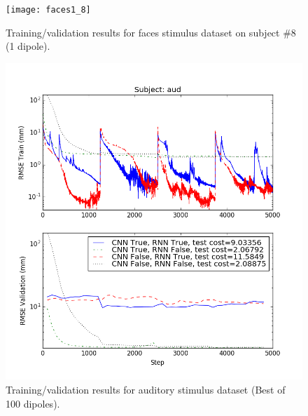\documentclass[journal]{IEEEtran}
\begin{document}
\begin{figure}[!h]
\centering
\texttt{[image: faces1\_8]}
\caption{Training/validation results for faces stimulus dataset on subject \#8 (1 dipole).}
\label{fig:faces_8}
\end{figure}

\begin{figure}[!h]
\centering
\includegraphics[width=6.75in]{aud100}
\caption{Training/validation results for auditory stimulus dataset (Best of 100 dipoles).}
\label{fig:aud100}
\end{figure}
\end{document}
